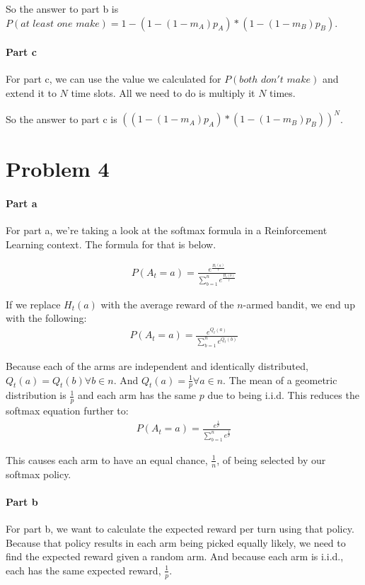 \documentclass[12pt]{article}
\begin{document}
So the answer to part b is $P(at\,\,least\,\,one\,\,make) = 1 - (1 - (1 - m_A)p_A) * (1 - (1 - m_B)p_B)$.

\paragraph{Part c} For part c, we can use the value we calculated for $P(both\,\,don't\,\,make)$ and extend it to $N$ time slots. All we need to do is multiply it $N$ times.

So the answer to part c is $((1 - (1 - m_A)p_A) * (1 - (1 - m_B)p_B))^N$.


\section{Problem 4}

\paragraph{Part a} For part a, we're taking a look at the softmax formula in a Reinforcement Learning context. The formula for that is below.

\begin{gather*}
  P(A_t = a) = \frac{e^{\frac{H_t(a)}{\tau}}}{\sum_{b=1}^n e^{\frac{H_t(b)}{\tau}}}
\end{gather*}

If we replace $H_t(a)$ with the average reward of the $n$-armed bandit, we end up with the following:
\begin{gather*}
  P(A_t = a) = \frac{e^{Q_t(a)}}{\sum_{b=1}^n e^{Q_t(b)}}
\end{gather*}

Because each of the arms are independent and identically distributed, $Q_t(a) = Q_t(b) \forall b \in n$. And $Q_t(a) = \frac{1}{p} \forall a \in n$. The mean of a geometric distribution is $\frac{1}{p}$ and each arm has the same $p$ due to being i.i.d. This reduces the softmax equation further to:
\begin{gather*}
  P(A_t = a) = \frac{e^{\frac{1}{p}}}{\sum_{b=1}^n e^{\frac{1}{p}}}
\end{gather*}

This causes each arm to have an equal chance, $\frac{1}{n}$, of being selected by our softmax policy.

\paragraph{Part b} For part b, we want to calculate the expected reward per turn using that policy. Because that policy results in each arm being picked equally likely, we need to find the expected reward given a random arm. And because each arm is i.i.d., each has the same expected reward, $\frac{1}{p}$.
\end{document}
